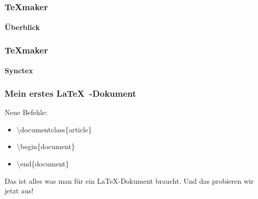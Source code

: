 
\begin{frame}
\frametitle{TeXmaker}
\framesubtitle{\"Uberblick}

\end{frame}


\begin{frame}
\frametitle{TeXmaker}
\framesubtitle{Synctex}

\end{frame}

\begin{frame}
\frametitle{Mein erstes \LaTeX~-Dokument}
\begin{block}{Neue Befehle:}
\begin{itemize}
\item \begin{ttfamily}\color{nounibaredII}\textbackslash documentclass\color{nounibagreenI}\color{black}\{article\}\end{ttfamily}
\item \begin{ttfamily}\color{unibablueI}\textbackslash begin\color{black}\{document\}\end{ttfamily}
\item \begin{ttfamily}\color{unibablueI}\textbackslash end\color{black}\{document\}\end{ttfamily}
\end{itemize}
\end{block}
Das ist alles was man f\"ur ein \LaTeX -Dokument braucht. Und das probieren wir jetzt aus!

\end{frame}
